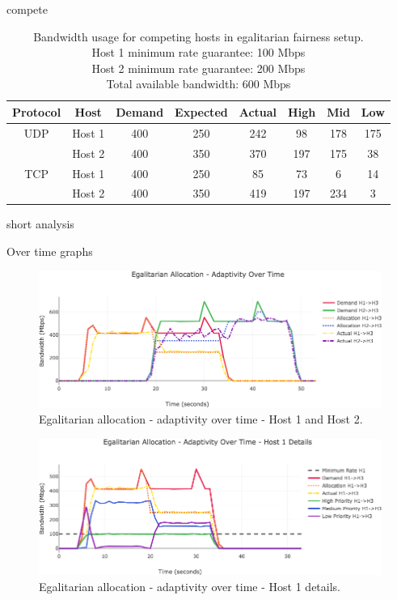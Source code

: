 \documentclass[accepted,single]{gipaper}
\begin{document}
compete

\begin{table}[h]
	\label{egal_c}
	\vspace{-2mm}
	\begin{center}
		\begin{small}
		\setlength\tabcolsep{1.5pt}
			\begin{tabular}{cccccccc}
				Protocol & Host & Demand & Expected & Actual & High & Mid & Low\\
				\hline
				UDP & Host 1 & 400 & 250 & 242 & 98 & 178 & 175\\
				    & Host 2 & 400 & 350 & 370 & 197 & 175 & 38\\
				\hline
				TCP & Host 1 & 400 & 250 & 85 & 73 & 6 & 14\\
				    & Host 2 & 400 & 350 & 419 & 197 & 234 & 3\\
			\end{tabular}
		\end{small}
	\end{center}
	\caption{Bandwidth usage for competing hosts in egalitarian fairness setup.\\
	Host 1 minimum rate guarantee: 100 Mbps\\
	Host 2 minimum rate guarantee: 200 Mbps\\	
	Total available bandwidth: 600 Mbps}
	\vspace{-3mm}
\end{table}

short analysis

Over time graphs

\begin{figure}
	\centering
	\includegraphics[width=6in]{figs/dbae_ot_udp_both.png}
	\caption{ Egalitarian allocation - adaptivity over time - Host 1 and Host 2. } \label{dbae_ot_both}
\end{figure}

\begin{figure}
	\centering
	\includegraphics[width=6in]{figs/dbae_ot_udp_h1.png}
	\caption{ Egalitarian allocation - adaptivity over time - Host 1 details. } \label{dpae_ot_h1}
\end{figure}
\end{document}
